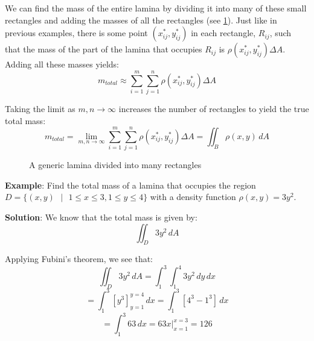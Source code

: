 We can find the mass of the entire lamina by dividing it into many of these 
small rectangles and adding the masses of all the rectangles (see 
\ref{fig:laminagrid}). Just like in previous examples, there is some point 
$(x_{ij}^*, y_{ij}^*)$ in each rectangle, $R_{ij}$, such that the mass of the 
part of the lamina that occupies $R_{ij}$ is $\rho (x_{ij}^*, y_{ij}^*) \Delta 
A$. Adding all these masses yields:
$$m_{total} \approx \sum_{i = 1}^m \sum_{j = 1}^n \rho (x_{ij}^*, y_{ij}^*) 
\Delta A$$

Taking the limit as $m, n \to \infty$ increases the number of rectangles to 
yield the true total mass:
$$m_{total} = \lim_{m, n \to \infty} \sum_{i = 1}^m \sum_{j = 1}^n \rho (x_{ij
}^*, y_{ij}^*) \Delta A = \iint_{\textit{B}} \rho (x, y)\,dA$$

\begin{figure}[htbp]
\centering
    \caption{A generic lamina divided into many rectangles}
    \label{fig:laminagrid}
\end{figure}

\textbf{Example}: Find the total mass of a lamina that occupies the region 
$\textit{D} = \{ \left( x, y \right) \text{ }| \text{ } 1 \leq x \leq 3, 1 
\leq y \leq 4 \}$ with a density function $\rho (x, y) = 3y^2$. 

\textbf{Solution}: We know that the total mass is given by:
$$\iint_{\textit{D}} 3y^2\,dA$$

Applying Fubini's theorem, we see that:
$$\iint_{\textit{D}} 3y^2\,dA = \int_1^3 \int_1^4 3y^2\,dy\,dx$$
$$= \int_1^3 \left[ y^3 \right]_{y = 1}^{y = 4}\,dx = \int_1^3 \left[4^3 - 
1^3 \right]\,dx$$
$$= \int_1^3 63 \,dx = 63x|_{x = 1}^{x = 3} = 126$$

